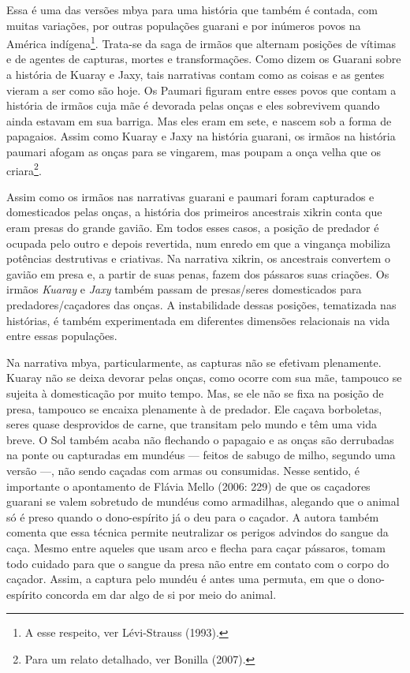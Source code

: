 {Essa é uma das versões mbya para uma história que também é contada, com
muitas variações, por outras populações guarani e por inúmeros povos na
América indígena\footnote{A esse respeito, ver Lévi-Strauss (1993).}.
Trata-se da saga de irmãos que alternam posições de vítimas e de
agentes de capturas, mortes e transformações. Como dizem os Guarani
sobre a história de Kuaray e Jaxy, tais narrativas contam como as
coisas e as gentes vieram a ser como são hoje. Os Paumari figuram entre
esses povos que contam a história de irmãos cuja mãe é devorada pelas
onças e eles sobrevivem quando ainda estavam em sua barriga. Mas eles
eram em sete, e nascem sob a forma de papagaios. Assim como Kuaray e
Jaxy na história guarani, os irmãos na história paumari afogam as onças
para se vingarem, mas poupam a onça velha que os criara\footnote{Para
um relato detalhado, ver Bonilla (2007).}.

Assim como os irmãos nas narrativas guarani e paumari foram capturados e
domesticados pelas onças, a história dos primeiros ancestrais xikrin
conta que eram presas do grande gavião. Em todos esses casos, a posição
de predador é ocupada pelo outro e depois revertida, num enredo em que
a vingança mobiliza potências destrutivas e criativas. Na narrativa
xikrin, os ancestrais convertem o gavião em presa e, a partir de suas
penas, fazem dos pássaros suas criações. Os irmãos \emph{Kuaray} e \emph{Jaxy} também
passam de presas/seres domesticados para predadores/caçadores das
onças. A instabilidade dessas posições, tematizada nas histórias, é
também experimentada em diferentes dimensões relacionais na vida entre
essas populações. 

Na narrativa mbya, particularmente, as capturas não se efetivam
plenamente. Kuaray não se deixa devorar pelas onças, como ocorre com
sua mãe, tampouco se sujeita à domesticação por muito tempo. Mas, se
ele não se fixa na posição de presa, tampouco se encaixa plenamente à
de predador. Ele caçava borboletas, seres quase desprovidos de carne,
que transitam pelo mundo e têm uma vida breve. O Sol também acaba não
flechando o papagaio e as onças são derrubadas na ponte ou capturadas
em mundéus --- feitos de sabugo de milho, segundo uma versão ---, não sendo
caçadas com armas ou consumidas. Nesse sentido, é importante o
apontamento de Flávia Mello (2006: 229) de que os caçadores guarani se
valem sobretudo de mundéus como armadilhas, alegando que o animal só é
preso quando o dono-espírito já o deu para o caçador. A autora também
comenta que essa técnica permite neutralizar os perigos advindos do
sangue da caça. Mesmo entre aqueles que usam arco e flecha para caçar
pássaros, tomam todo cuidado para que o sangue da presa não entre em
contato com o corpo do caçador. Assim, a captura pelo mundéu é antes
uma permuta, em que o dono-espírito concorda em dar algo de si por meio
do animal.

}
